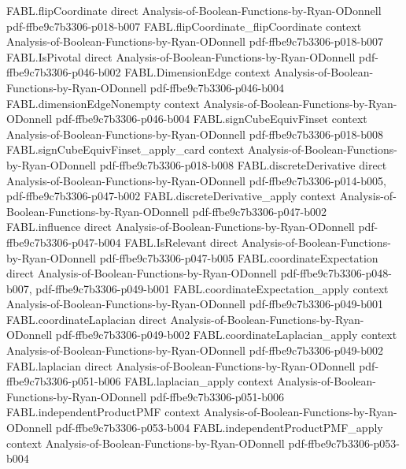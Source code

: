 \begin{theorem}
  {FABL.flipCoordinate}
  {direct}
  {Analysis-of-Boolean-Functions-by-Ryan-ODonnell}
  {pdf-ffbe9c7b3306-p018-b007}
\proofstep
  {FABL.flipCoordinate_flipCoordinate}
  {context}
  {Analysis-of-Boolean-Functions-by-Ryan-ODonnell}
  {pdf-ffbe9c7b3306-p018-b007}
\proofstep
  {FABL.IsPivotal}
  {direct}
  {Analysis-of-Boolean-Functions-by-Ryan-ODonnell}
  {pdf-ffbe9c7b3306-p046-b002}
\proofstep
  {FABL.DimensionEdge}
  {context}
  {Analysis-of-Boolean-Functions-by-Ryan-ODonnell}
  {pdf-ffbe9c7b3306-p046-b004}
\proofstep
  {FABL.dimensionEdgeNonempty}
  {context}
  {Analysis-of-Boolean-Functions-by-Ryan-ODonnell}
  {pdf-ffbe9c7b3306-p046-b004}
\proofstep
  {FABL.signCubeEquivFinset}
  {context}
  {Analysis-of-Boolean-Functions-by-Ryan-ODonnell}
  {pdf-ffbe9c7b3306-p018-b008}
\proofstep
  {FABL.signCubeEquivFinset_apply_card}
  {context}
  {Analysis-of-Boolean-Functions-by-Ryan-ODonnell}
  {pdf-ffbe9c7b3306-p018-b008}
\proofstep
  {FABL.discreteDerivative}
  {direct}
  {Analysis-of-Boolean-Functions-by-Ryan-ODonnell}
  {pdf-ffbe9c7b3306-p014-b005,
    pdf-ffbe9c7b3306-p047-b002}
\proofstep
  {FABL.discreteDerivative_apply}
  {context}
  {Analysis-of-Boolean-Functions-by-Ryan-ODonnell}
  {pdf-ffbe9c7b3306-p047-b002}
\proofstep
  {FABL.influence}
  {direct}
  {Analysis-of-Boolean-Functions-by-Ryan-ODonnell}
  {pdf-ffbe9c7b3306-p047-b004}
\proofstep
  {FABL.IsRelevant}
  {direct}
  {Analysis-of-Boolean-Functions-by-Ryan-ODonnell}
  {pdf-ffbe9c7b3306-p047-b005}
\proofstep
  {FABL.coordinateExpectation}
  {direct}
  {Analysis-of-Boolean-Functions-by-Ryan-ODonnell}
  {pdf-ffbe9c7b3306-p048-b007,
    pdf-ffbe9c7b3306-p049-b001}
\proofstep
  {FABL.coordinateExpectation_apply}
  {context}
  {Analysis-of-Boolean-Functions-by-Ryan-ODonnell}
  {pdf-ffbe9c7b3306-p049-b001}
\proofstep
  {FABL.coordinateLaplacian}
  {direct}
  {Analysis-of-Boolean-Functions-by-Ryan-ODonnell}
  {pdf-ffbe9c7b3306-p049-b002}
\proofstep
  {FABL.coordinateLaplacian_apply}
  {context}
  {Analysis-of-Boolean-Functions-by-Ryan-ODonnell}
  {pdf-ffbe9c7b3306-p049-b002}
\proofstep
  {FABL.laplacian}
  {direct}
  {Analysis-of-Boolean-Functions-by-Ryan-ODonnell}
  {pdf-ffbe9c7b3306-p051-b006}
\proofstep
  {FABL.laplacian_apply}
  {context}
  {Analysis-of-Boolean-Functions-by-Ryan-ODonnell}
  {pdf-ffbe9c7b3306-p051-b006}
\proofstep
  {FABL.independentProductPMF}
  {context}
  {Analysis-of-Boolean-Functions-by-Ryan-ODonnell}
  {pdf-ffbe9c7b3306-p053-b004}
\proofstep
  {FABL.independentProductPMF_apply}
  {context}
  {Analysis-of-Boolean-Functions-by-Ryan-ODonnell}
  {pdf-ffbe9c7b3306-p053-b004}
\proofstep

\end{theorem}
